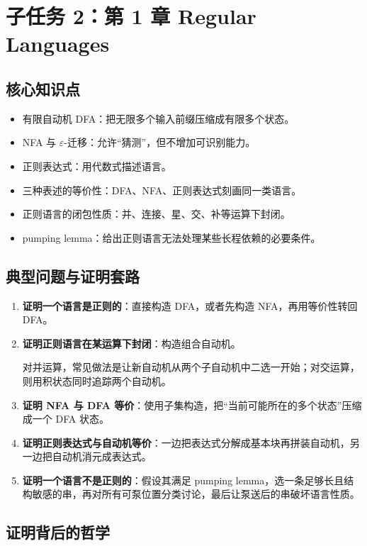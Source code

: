 \section{子任务 2：第 1 章 Regular Languages}

\subsection{核心知识点}

\begin{itemize}[leftmargin=2em]
  \item 有限自动机 DFA：把无限多个输入前缀压缩成有限多个状态。
  \item NFA 与 $\varepsilon$-迁移：允许“猜测”，但不增加可识别能力。
  \item 正则表达式：用代数式描述语言。
  \item 三种表述的等价性：DFA、NFA、正则表达式刻画同一类语言。
  \item 正则语言的闭包性质：并、连接、星、交、补等运算下封闭。
  \item pumping lemma：给出正则语言无法处理某些长程依赖的必要条件。
\end{itemize}

\subsection{典型问题与证明套路}

\begin{enumerate}[leftmargin=2em]
  \item \textbf{证明一个语言是正则的}：直接构造 DFA，或者先构造 NFA，再用等价性转回 DFA。
  \item \textbf{证明正则语言在某运算下封闭}：构造组合自动机。
  
  对并运算，常见做法是让新自动机从两个子自动机中二选一开始；对交运算，则用积状态同时追踪两个自动机。
  \item \textbf{证明 NFA 与 DFA 等价}：使用子集构造，把“当前可能所在的多个状态”压缩成一个 DFA 状态。
  \item \textbf{证明正则表达式与自动机等价}：一边把表达式分解成基本块再拼装自动机，另一边把自动机消元成表达式。
  \item \textbf{证明一个语言不是正则的}：假设其满足 pumping lemma，选一条足够长且结构敏感的串，再对所有可泵位置分类讨论，最后让泵送后的串破坏语言性质。
\end{enumerate}

\subsection{证明背后的哲学}

